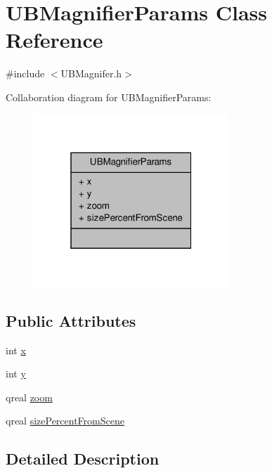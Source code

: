 \hypertarget{class_u_b_magnifier_params}{\section{U\-B\-Magnifier\-Params Class Reference}
\label{de/df9/class_u_b_magnifier_params}
}


{\ttfamily \#include $<$U\-B\-Magnifer.\-h$>$}



Collaboration diagram for U\-B\-Magnifier\-Params\-:
\nopagebreak
\begin{figure}[H]
\begin{center}
\leavevmode
\includegraphics[width=208pt]{da/ded/class_u_b_magnifier_params__coll__graph}
\end{center}
\end{figure}
\subsection*{Public Attributes}
\begin{DoxyCompactItemize}
\item 
int \hyperlink{class_u_b_magnifier_params_ad723e9f7b9c70e5595eeb964b140bcb8}{x}
\item 
int \hyperlink{class_u_b_magnifier_params_a3948b6acc58f1028e2c7936bf8a23c93}{y}
\item 
qreal \hyperlink{class_u_b_magnifier_params_a5f687058468b6b83f15955c657480bc8}{zoom}
\item 
qreal \hyperlink{class_u_b_magnifier_params_a5f66a63500cfbcdae1142076be54f5fc}{size\-Percent\-From\-Scene}
\end{DoxyCompactItemize}


\subsection{Detailed Description}


